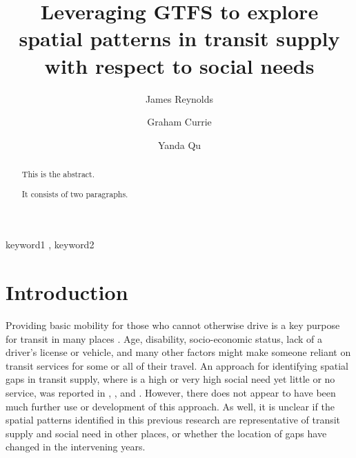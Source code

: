 \documentclass[preprint, 3p,
authoryear]{elsarticle} %
\begin{document}
\begin{frontmatter}

  \title{Leveraging GTFS to explore spatial patterns in transit supply
with respect to social needs}
    \author[Public Transport Research Group (PTRG)]{James Reynolds%
  }
    \author[Public Transport Research Group (PTRG)]{Graham Currie%
  }
    \author[Public Transport Research Group (PTRG)]{Yanda Qu%
  }
  
  \begin{abstract}
  This is the abstract.

  It consists of two paragraphs.
  \end{abstract}
    \begin{keyword}
    keyword1 \sep 
    keyword2
  \end{keyword}
  
 \end{frontmatter}

\hypertarget{introduction}{%
\section{Introduction}\label{introduction}}

Providing basic mobility for those who cannot otherwise drive is a key
purpose for transit in many places \citep{Currie:2016aa}. Age,
disability, socio-economic status, lack of a driver's license or
vehicle, and many other factors might make someone reliant on transit
services for some or all of their travel. An approach for identifying
spatial gaps in transit supply, where is a high or very high social need
yet little or no service, was reported in \citet{Currie2003Hobart},
\citet{Currie2004Gap}, \citet{Currie2007Identifying} and
\citet{currie2010identifying}. However, there does not appear to have
been much further use or development of this approach. As well, it is
unclear if the spatial patterns identified in this previous research are
representative of transit supply and social need in other places, or
whether the location of gaps have changed in the intervening years.
\end{document}
